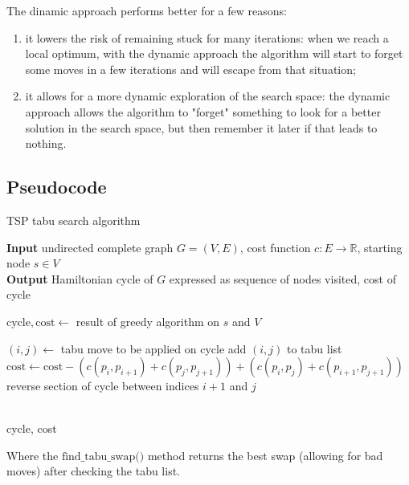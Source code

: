 The dinamic approach performs better for a few reasons:

\begin{enumerate}
    \item it lowers the risk of remaining stuck for many iterations: when we reach a local optimum, with the dynamic approach the algorithm will start to forget some moves in a few iterations and will escape from that situation;
    \item it allows for a more dynamic exploration of the search space: the dynamic approach allows the algorithm to "forget" something to look for a better solution in the search space, but then remember it later if that leads to nothing.
\end{enumerate}

\subsection{Pseudocode}

\begin{algorithm}
    \caption{TSP tabu search algorithm}
    \hspace*{\algorithmicindent} \textbf{Input} undirected complete graph $G=(V,E)$, cost function $c:E\rightarrow\mathbb{R}$, starting node $s\in V$\\
    \hspace*{\algorithmicindent} \textbf{Output} Hamiltonian cycle of $G$ expressed as sequence of nodes visited, cost of cycle\\
    \begin{algorithmic}
        
        \State $\mbox{cycle}, \mbox{cost} \gets$ result of greedy algorithm on $s$ and $V$

            \State $(i, j)\gets$ tabu move to be applied on cycle
            \State add $(i,j)$ to tabu list
            \State $\mbox{cost}\gets\mbox{cost}-(c(p_i,p_{i+1})+c(p_j,p_{j+1}))+(c(p_i,p_{j})+c(p_{i+1},p_{j+1}))$
            \State reverse section of cycle between indices $i+1$ and $j$

        \EndWhile\\

        \Return cycle, cost
    \end{algorithmic}
\end{algorithm}

Where the $\mbox{find\_tabu\_swap()}$ method returns the best swap (allowing for bad moves) after checking the tabu list.

